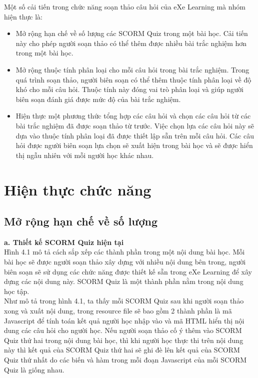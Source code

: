 	Một số cải tiến trong chức năng soạn thảo câu hỏi của eXe Learning mà nhóm hiện thực là:
	
	\begin{itemize}
		\item Mở rộng hạn chế về số lượng các SCORM Quiz trong một bài học. Cải tiến này cho phép người soạn thảo có thể thêm được nhiều bài trắc nghiệm hơn trong một bài học.
		
		\item Mở rộng thuộc tính phân loại cho mỗi câu hỏi trong bài trắc nghiệm. Trong quá trình soạn thảo, người biên soạn có thể thêm thuộc tính phân loại về độ khó cho mỗi câu hỏi. Thuộc tính này đóng vai trò phân loại và giúp người biên soạn đánh giá được mức độ của bài trắc nghiệm.
		
		\item Hiện thực một phương thức tổng hợp các câu hỏi và chọn các câu hỏi từ các bài trắc nghiệm đã được soạn thảo từ trước. Việc chọn lựa các câu hỏi này sẽ dựa vào thuộc tính phân loại đã được thiết lập sẵn trên mỗi câu hỏi. Các câu hỏi được người biên soạn lựa chọn sẽ xuất hiện trong bài học và sẽ được hiển thị ngẫu nhiên với mỗi người học khác nhau.
		
	\end{itemize}
	
\section{Hiện thực chức năng}
\subsection{Mở rộng hạn chế về số lượng}

\textbf{a. Thiết kế SCORM Quiz hiện tại}\\

	Hình 4.1 mô tả cách sắp xếp các thành phần trong một nội dung bài học. Mỗi bài học sẽ được người soạn thảo xây dựng với nhiều nội dung bên trong, người biên soạn sẽ sử dụng các chức năng được thiết kế sẵn trong eXe Learning để xây dựng các nội dung này. SCORM Quiz là một thành phần nằm trong nội dung học tập.\\
	
	Như mô tả trong hình 4.1, ta thấy mỗi SCORM Quiz sau khi người soạn thảo xong và xuất nội dung, trong resource file sẽ bao gồm 2 thành phần là mã Javascript để tính toán kết quả người học nhập vào và mã HTML hiển thị nội dung các câu hỏi cho người học. Nếu người soạn thảo cố ý thêm vào SCORM Quiz thứ hai trong nội dung bài học, thì khi người học thực thi trên nội dung này thì kết quả của SCORM Quiz thứ hai sẽ ghi đè lên kết quả của SCORM Quiz thứ nhất do các biến và hàm trong mỗi đoạn Javascript của mỗi SCORM Quiz là giống nhau.

